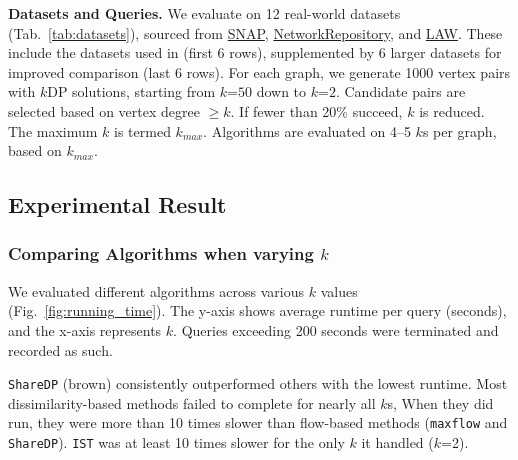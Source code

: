 {\textbf{Datasets and Queries.}}
We evaluate on 12 real-world datasets (Tab.~\ref{tab:datasets}), sourced from \href{https://snap.stanford.edu/}{SNAP}, \href{http://networkrepository.com/networks.php}{NetworkRepository}, and \href{https://law.di.unimi.it/index.php}{LAW}. 
These include the datasets used in \cite{SCB} (first 6 rows), supplemented by 6 larger datasets for improved comparison (last 6 rows).
For each graph, we generate 1000 vertex pairs with \( k \)DP solutions, starting from \( k \)=\( 50 \) down to \( k \)=\( 2 \). 
Candidate pairs are selected based on vertex degree \( \geq k \). 
If fewer than 20\% succeed, \( k \) is reduced. The maximum \( k \) is termed \( k_{max} \). Algorithms are evaluated on 4–5 \( k \)s per graph, based on \( k_{max} \).

%         

\subsection{Experimental Result}\label{sec:experiment_result}
\subsubsection{Comparing Algorithms when varying $k$}\label{sec:experiment_time}

We evaluated different algorithms across various $k$ values (Fig.~\ref{fig:running_time}). 
The y-axis shows average runtime per query (seconds), and the x-axis represents $k$. 
Queries exceeding 200 seconds were terminated and recorded as such. 


\texttt{ShareDP} (brown) consistently outperformed others with the lowest runtime. 
Most dissimilarity-based methods failed to complete for nearly all $k$s, 
When they did run, they were more than 10 times slower than flow-based methods (\texttt{maxflow} and \texttt{ShareDP}). 
\texttt{IST} was at least 10 times slower for the only \( k \) it handled (\( k \)=2).

